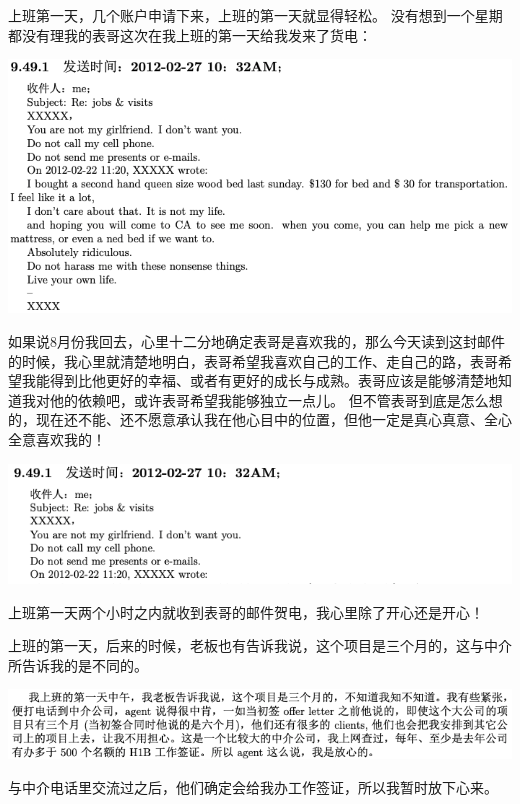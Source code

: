 \documentclass[9pt, b5paper]{article}
\begin{document}
上班第一天，几个账户申请下来，上班的第一天就显得轻松。 没有想到一个星期都没有理我的表哥这次在我上班的第一天给我发来了货电： 

\begin{center}
\includegraphics[width=.9\linewidth]{./pic/p1p104-2.png}
\end{center}

如果说8月份我回去，心里十二分地确定表哥是喜欢我的，那么今天读到这封邮件的时候，我心里就清楚地明白，表哥希望我喜欢自己的工作、走自己的路，表哥希望我能得到比他更好的幸福、或者有更好的成长与成熟。表哥应该是能够清楚地知道我对他的依赖吧，或许表哥希望我能够独立一点儿。 但不管表哥到底是怎么想的，现在还不能、还不愿意承认我在他心目中的位置，但他一定是真心真意、全心全意喜欢我的！

\begin{center}
\includegraphics[width=.9\linewidth]{./pic/p1p104-1.png}
\end{center}

上班第一天两个小时之内就收到表哥的邮件贺电，我心里除了开心还是开心！

上班的第一天，后来的时候，老板也有告诉我说，这个项目是三个月的，这与中介所告诉我的是不同的。 

\begin{center}
\includegraphics[width=.9\linewidth]{./pic/p1p105-1.png}
\end{center}

与中介电话里交流过之后，他们确定会给我办工作签证，所以我暂时放下心来。 
\end{document}
